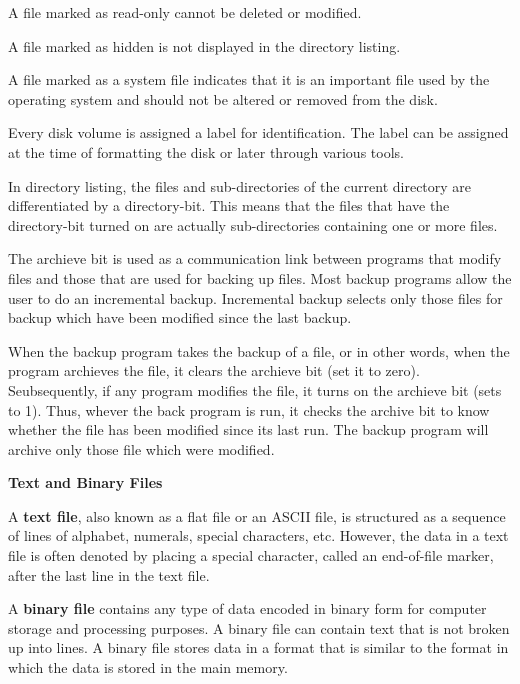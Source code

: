 \vskip 3mm
 A file marked as read-only cannot be deleted or modified.

\vskip 3mm
 A file marked as hidden is not displayed in the directory listing.

\vskip 3mm
 A file marked as a system file indicates that it is an important file used by the operating system and should not be altered or removed from the disk.

\vskip 3mm
 Every disk volume is assigned a label for identification. The label can be assigned at the time of formatting the disk or later through various tools.

\vskip 3mm
 In directory listing, the files and sub-directories of the current directory are differentiated by a directory-bit. This means that the files that have the directory-bit turned on are actually sub-directories containing one or more files.

\filbreak
\vskip 3mm
 The archieve bit is used as a communication link between programs that modify files and those that are used for backing up files. Most backup programs allow the user to do an incremental backup. Incremental backup selects only those files for backup which have been modified since the last backup.

\vskip 1mm
When the backup program takes the backup of a file, or in other words, when the program archieves the file, it clears the archieve bit (set it to zero). Seubsequently, if any program modifies the file, it turns on the archieve bit (sets to 1). Thus, whever the back program is run, it checks the archive bit to know whether the file has been modified since its last run. The backup program will archive only those file which were modified.

\filbreak
\vskip 1cm
{\bf Text and Binary Files}

\vskip 1mm
A {\bf text file}, also known as a flat file or an ASCII file, is structured as a sequence of lines of alphabet, numerals, special characters, etc. However, the data in a text file is often denoted by placing a special character, called an end-of-file marker, after the last line in the text file.

\vskip 1mm
A {\bf binary file} contains any type of data encoded in binary form for computer storage and processing purposes. A binary file can contain text that is not broken up into lines. A binary file stores data in a format that is similar to the format in which the data is stored in the main memory.


